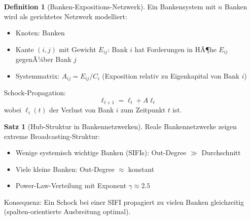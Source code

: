 ﻿\documentclass[a4paper,12pt]{report}
\theoremstyle{definition}
\newtheorem{definition}{Definition}
\newtheorem{satz}{Satz}
\begin{document}
	\begin{definition}[Banken-Expositions-Netzwerk]
		Ein Bankensystem mit $n$ Banken wird als gerichtetes Netzwerk modelliert:
		\begin{itemize}
			\item Knoten: Banken
			\item Kante $(i,j)$ mit Gewicht $E_{ij}$: Bank $i$ hat Forderungen in HÃ¶he $E_{ij}$ gegenÃ¼ber Bank $j$
			\item Systemmatrix: $A_{ij} = E_{ij} / C_i$ (Exposition relativ zu Eigenkapital von Bank $i$)
		\end{itemize}
		
		Schock-Propagation:
		\[
		\ell_{t+1} = \ell_t + A \ell_t
		\]
		wobei $\ell_i(t)$ der Verlust von Bank $i$ zum Zeitpunkt $t$ ist.
	\end{definition}
	
	\begin{satz}[Hub-Struktur in Bankennetzwerken]
		Reale Bankennetzwerke zeigen extreme Broadcasting-Struktur:
		\begin{itemize}
			\item Wenige systemisch wichtige Banken (SIFIs): Out-Degree $\gg$ Durchschnitt
			\item Viele kleine Banken: Out-Degree $\approx$ konstant
			\item Power-Law-Verteilung mit Exponent $\gamma \approx 2.5$
		\end{itemize}
		
		Konsequenz: Ein Schock bei einer SIFI propagiert zu vielen Banken gleichzeitig (spalten-orientierte Ausbreitung optimal).
	\end{satz}
	
\end{document}
